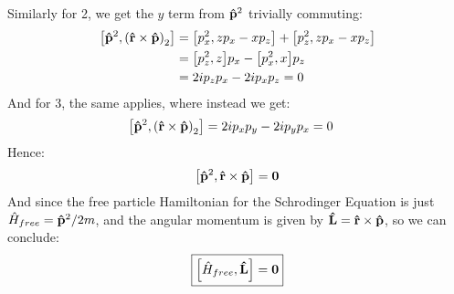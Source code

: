 \documentclass[12pt]{article}
\begin{document}
Similarly for 2, we get the $y$ term from $\vu{p}^2$ trivially commuting:
\begin{align*}
  \comm{\vu{p}^2}{{(\vu{r}\times\vu{p})}_2}&=
  \comm{p_x^2}{zp_x-xp_z}+\comm{p_z^2}{zp_x-xp_z}\\
  &=\comm{p_z^2}{z}p_x-\comm{p_x^2}{x}p_z\\
  &=2ip_z p_x-2ip_x p_z=0
\end{align*}
And for 3, the same applies, where instead we get:
\begin{align*}
  \comm{\vu{p}^2}{{(\vu{r}\times\vu{p})}_2}&=
  2ip_x p_y-2ip_y p_x=0
\end{align*}
Hence:
\begin{equation}
  \label{eq:p1a}
  \comm{\vu{p}^2}{\vu{r}\times\vu{p}}=\vb{0}
\end{equation}
And since the free particle Hamiltonian for the Schrodinger Equation is just $\hat{H}_{free}=\vu{p}^2/2m$, and the angular momentum is given by $\vu{L}=\vu{r}\times\vu{p}$, so we can conclude:
\begin{equation}
  \label{eq:p1b}
  \boxed{\comm{\hat{H}_{free}}{\vu{L}}=\vb{0}}
\end{equation}
\newpage
\end{document}
